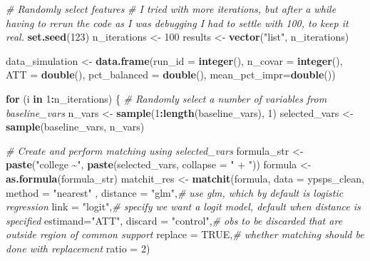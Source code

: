 \documentclass[
]{article}
\newenvironment{Shaded}{\begin{snugshade}}{\end{snugshade}}
\newcommand{\AttributeTok}[1]{\textcolor[rgb]{0.13,0.29,0.53}{#1}}
\newcommand{\CommentTok}[1]{\textcolor[rgb]{0.56,0.35,0.01}{\textit{#1}}}
\newcommand{\ConstantTok}[1]{\textcolor[rgb]{0.56,0.35,0.01}{#1}}
\newcommand{\ControlFlowTok}[1]{\textcolor[rgb]{0.13,0.29,0.53}{\textbf{#1}}}
\newcommand{\DecValTok}[1]{\textcolor[rgb]{0.00,0.00,0.81}{#1}}
\newcommand{\FunctionTok}[1]{\textcolor[rgb]{0.13,0.29,0.53}{\textbf{#1}}}
\newcommand{\NormalTok}[1]{#1}
\newcommand{\OtherTok}[1]{\textcolor[rgb]{0.56,0.35,0.01}{#1}}
\newcommand{\SpecialCharTok}[1]{\textcolor[rgb]{0.81,0.36,0.00}{\textbf{#1}}}
\newcommand{\StringTok}[1]{\textcolor[rgb]{0.31,0.60,0.02}{#1}}
\begin{document}
\begin{Shaded}
\begin{Highlighting}[]
\CommentTok{\# Randomly select features}
\CommentTok{\# I tried with more iterations, but after a while having to rerun the code as I was debugging I had to settle with 100, to keep it real. }
\FunctionTok{set.seed}\NormalTok{(}\DecValTok{123}\NormalTok{)  }
\NormalTok{n\_iterations }\OtherTok{\textless{}{-}} \DecValTok{100}
\NormalTok{results }\OtherTok{\textless{}{-}} \FunctionTok{vector}\NormalTok{(}\StringTok{"list"}\NormalTok{, n\_iterations)}

\NormalTok{data\_simulation }\OtherTok{\textless{}{-}} \FunctionTok{data.frame}\NormalTok{(}\AttributeTok{run\_id =} \FunctionTok{integer}\NormalTok{(),}
                              \AttributeTok{n\_covar =} \FunctionTok{integer}\NormalTok{(),}
                              \AttributeTok{ATT =} \FunctionTok{double}\NormalTok{(),}
                              \AttributeTok{pct\_balanced =} \FunctionTok{double}\NormalTok{(), }
                              \AttributeTok{mean\_pct\_impr=}\FunctionTok{double}\NormalTok{())}



\ControlFlowTok{for}\NormalTok{ (i }\ControlFlowTok{in} \DecValTok{1}\SpecialCharTok{:}\NormalTok{n\_iterations) \{}
  \CommentTok{\# Randomly select a number of variables from baseline\_vars}
\NormalTok{  n\_vars }\OtherTok{\textless{}{-}} \FunctionTok{sample}\NormalTok{(}\DecValTok{1}\SpecialCharTok{:}\FunctionTok{length}\NormalTok{(baseline\_vars), }\DecValTok{1}\NormalTok{)}
\NormalTok{  selected\_vars }\OtherTok{\textless{}{-}} \FunctionTok{sample}\NormalTok{(baseline\_vars, n\_vars)}

  \CommentTok{\# Create and perform matching using selected\_vars}
\NormalTok{  formula\_str }\OtherTok{\textless{}{-}} \FunctionTok{paste}\NormalTok{(}\StringTok{"college \textasciitilde{}"}\NormalTok{, }\FunctionTok{paste}\NormalTok{(selected\_vars, }\AttributeTok{collapse =} \StringTok{" + "}\NormalTok{))}
\NormalTok{  formula }\OtherTok{\textless{}{-}} \FunctionTok{as.formula}\NormalTok{(formula\_str)}
\NormalTok{  matchit\_res }\OtherTok{\textless{}{-}} \FunctionTok{matchit}\NormalTok{(formula, }\AttributeTok{data =}\NormalTok{ ypsps\_clean, }\AttributeTok{method =} \StringTok{"nearest"}\NormalTok{ , }
                         \AttributeTok{distance =} \StringTok{"glm"}\NormalTok{,}\CommentTok{\# use glm, which by default is logistic regression}
                         \AttributeTok{link =} \StringTok{"logit"}\NormalTok{,}\CommentTok{\# specify we want a logit model, default when distance is specified}
                         \AttributeTok{estimand=}\StringTok{"ATT"}\NormalTok{,}
                         \AttributeTok{discard =} \StringTok{"control"}\NormalTok{,}\CommentTok{\# obs to be discarded that are outside region of common support}
                         \AttributeTok{replace =} \ConstantTok{TRUE}\NormalTok{,}\CommentTok{\# whether matching should be done with replacement}
                         \AttributeTok{ratio =} \DecValTok{2}\NormalTok{)}


\end{Highlighting}
\end{Shaded}
\end{document}
